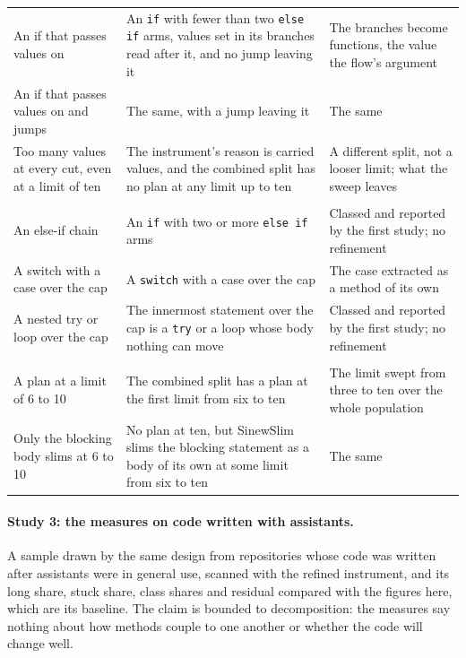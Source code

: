 \documentclass[11pt,a4paper]{article}
\newcommand{\sig}[1]{\texttt{#1}}
\begin{document}
\begin{table}[tbp]
{\begin{tabular}{>{\raggedright\arraybackslash}p{3.3cm}>{\raggedright\arraybackslash}p{7.0cm}>{\raggedright\arraybackslash}p{4.9cm}}
An if that passes values on & An \sig{if} with fewer than two \sig{else if} arms, values set in its branches read after it, and no jump leaving it & The branches become functions, the value the flow's argument \\
An if that passes values on and jumps & The same, with a jump leaving it & The same \\
Too many values at every cut, even at a limit of ten & The instrument's reason is carried values, and the combined split has no plan at any limit up to ten & A different split, not a looser limit; what the sweep leaves \\
\midrule
\multicolumn{3}{l}{\emph{Dispatch and nesting} (indivisible)} \\
An else-if chain & An \sig{if} with two or more \sig{else if} arms & Classed and reported by the first study; no refinement \\
A switch with a case over the cap & A \sig{switch} with a case over the cap & The case extracted as a method of its own \\
A nested try or loop over the cap & The innermost statement over the cap is a \sig{try} or a loop whose body nothing can move & Classed and reported by the first study; no refinement \\
\midrule
\multicolumn{3}{l}{\emph{Data within reach of a higher limit} (data)} \\
A plan at a limit of 6 to 10 & The combined split has a plan at the first limit from six to ten & The limit swept from three to ten over the whole population \\
Only the blocking body slims at 6 to 10 & No plan at ten, but SinewSlim slims the blocking statement as a body of its own at some limit from six to ten & The same \\
\bottomrule
\end{tabular}}
\end{table}

\paragraph{Study 3: the measures on code written with assistants.} A
sample drawn by the same design from repositories whose code was written
after assistants were in general use, scanned with the refined instrument,
and its long share, stuck share, class shares and residual compared with
the figures here, which are its baseline. The claim is bounded to
decomposition: the measures say nothing about how methods couple to one
another or whether the code will change well.
\end{document}
